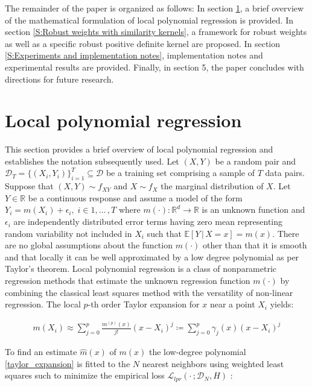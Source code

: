 \documentclass[preprint,1p,times]{elsarticle}
\begin{document}
The remainder of the paper is organized as follows: In section \ref{S:Local polynomial regression}, a brief overview of the mathematical formulation of local polynomial regression is provided. In section \ref{S:Robust weights with similarity kernels}, a framework for robust weights as well as a specific robust positive definite kernel are proposed. In section \ref{S:Experiments and implementation notes}, implementation notes and experimental results are provided. Finally, in section 5, the paper concludes with directions for future research.

\section{Local polynomial regression}
\label{S:Local polynomial regression}
This section provides a brief overview of local polynomial regression and establishes the notation subsequently used. Let $( X, Y )$ be a random pair and $\mathcal{D}_T = \{(X_i,Y_i)\}_{i=1}^{T} \subseteq \mathcal{D}$ be a training set comprising a sample of $T$ data pairs. Suppose that $(X , Y) \sim f_{XY}$ and $X \sim f_X$ the marginal distribution of $X$. Let $Y \in \mathbb{R}$ be a continuous response and assume a model of the form $Y_i=m(X_i) + \epsilon_i, \; i \in 1,... \, ,T$ where $m(\cdot): \mathbb{R}^d \rightarrow \mathbb{R }$ is an unknown function and $\epsilon_i$ are independently distributed error terms having zero mean representing random variability not included in $X_i$ such that $\mathbb{E}[Y \, | \,X=x] = m(x)$. There are no global assumptions about the function $m(\cdot)$ other than that it is smooth and that locally it can be well approximated by a low degree polynomial as per Taylor’s theorem. Local polynomial regression is a class of nonparametric regression methods that estimate the unknown regression function $m(\cdot)$ by combining the classical least squares method with the versatility of non-linear regression. The local $p$-th order Taylor expansion for $x$ near a point $X_i$ yields:

\begin{align}
m(X_i) \approx \sum_{j=0}^p \frac{m^{(p)}(x)}{j!} (x - X_i)^j \coloneqq \sum_{j=0}^p \gamma_j(x)(x - X_i)^j
\label{taylor_expansion}
\end{align}

To find an estimate $\hat{m}(x)$ of $m(x)$ the low-degree polynomial \eqref{taylor_expansion} is fitted to the $N$ nearest neighbors using weighted least squares such to minimize the empirical loss $\mathcal{L}_{lpr}( \cdot \, ; \mathcal{D}_N , H)$ :
\end{document}
